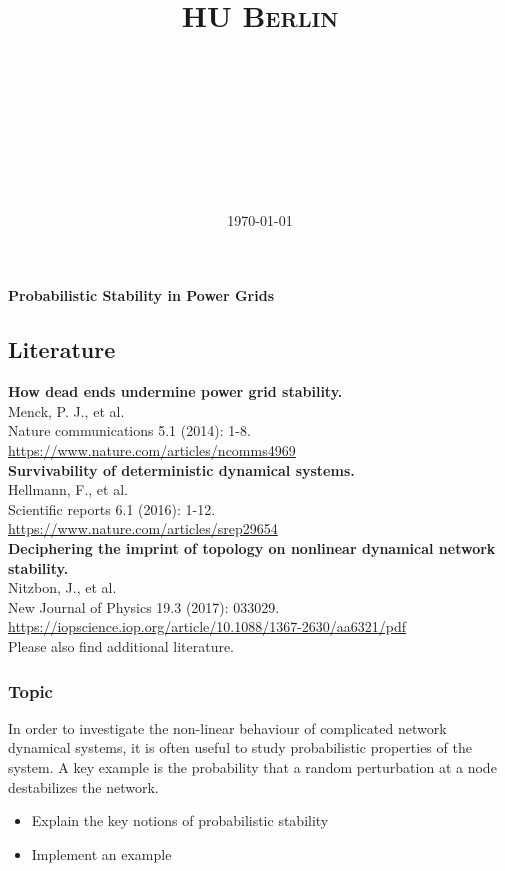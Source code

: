 \documentclass[a4paper,12pt]{article}
\title{
\vspace{2in}
\huge{\textsc{HU Berlin}\\\vspace{0.3cm}\hmwkClass}\\
\horrule{0.5pt} \\[0.4cm] %
\huge{\textmd{\textbf{\ \hmwkTitle}}}\\
\horrule{2pt} \\[0.5cm] %
\vspace{3in}
}
\author{\Large{\textbf{\hmwkAuthorName}}}
\date{\today} %
\newcommand{\hmwkTitle}{Probabilistic Stability in Power Grids} %
\newcommand{\hmwkDueDate}{} %
\begin{document}



\vspace*{1mm}
\begin{center}
    {\LARGE\textbf{\hmwkTitle}}\\
   \hmwkDueDate
\end{center}

\subsection*{Literature}
\textbf{How dead ends undermine power grid stability.}\\
Menck, P. J., et al.\\
Nature communications 5.1 (2014): 1-8.\\
\url{https://www.nature.com/articles/ncomms4969}\\

\textbf{Survivability of deterministic dynamical systems.}\\
Hellmann, F., et al. \\
Scientific reports 6.1 (2016): 1-12.\\
\url{https://www.nature.com/articles/srep29654}\\

\textbf{Deciphering the imprint of topology on nonlinear dynamical network stability.}\\
Nitzbon, J., et al.\\
New Journal of Physics 19.3 (2017): 033029.\\
\url{https://iopscience.iop.org/article/10.1088/1367-2630/aa6321/pdf}
\\

Please also find additional literature.

\subsubsection*{Topic}

In order to investigate the non-linear behaviour of complicated network dynamical systems, it is often useful to study probabilistic properties of the system. A key example is the probability that a random perturbation at a node destabilizes the network.


\small{
\begin{itemize}
\item Explain the key notions of probabilistic stability
\item Implement an example
\end{itemize}}
\end{document}
